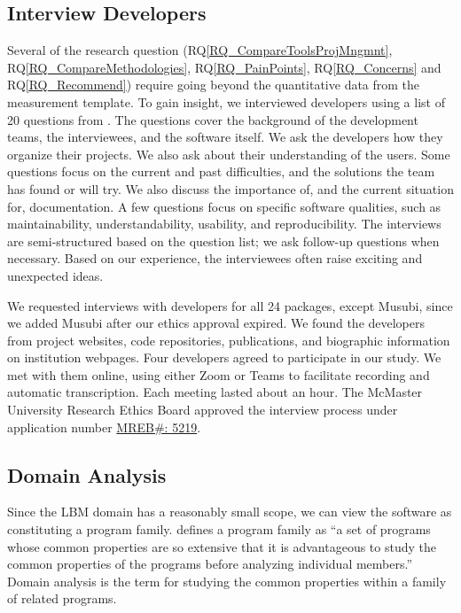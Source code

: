 \documentclass[final, 3p, times, authoryear]{elsarticle}
\newcommand{\rqref}[1]{RQ\ref{#1}}
\begin{document}
\subsection{Interview Developers} \label{SecSurvey}

Several of the research question (\rqref{RQ_CompareToolsProjMngmnt},
\rqref{RQ_CompareMethodologies}, \rqref{RQ_PainPoints}, \rqref{RQ_Concerns} and
\rqref{RQ_Recommend}) require going beyond the quantitative data from the
measurement template. To gain insight, we interviewed developers using a list of
20 questions from \citet{SmithEtAl2021}. The questions cover the background of
the development teams, the interviewees, and the software itself. We ask the
developers how they organize their projects. We also ask about their
understanding of the users. Some questions focus on the current and past
difficulties, and the solutions the team has found or will try. We also discuss
the importance of, and the current situation for, documentation. A few questions
focus on specific software qualities, such as maintainability,
understandability, usability, and reproducibility. The interviews are
semi-structured based on the question list; we ask follow-up questions when
necessary. Based on our experience, the interviewees often raise exciting and
unexpected ideas.

We requested interviews with developers for all 24 packages, except Musubi,
since we added Musubi after our ethics approval expired. We found the developers
from project websites, code repositories, publications, and biographic
information on institution webpages. Four developers agreed to participate in
our study. We met with them online, using either Zoom or Teams to facilitate
recording and automatic transcription. Each meeting lasted about an hour. The
McMaster University Research Ethics Board approved the interview process under
application number
\href{https://github.com/smiths/AIMSS/blob/master/StateOfPractice/MACREM/Application.pdf}
{MREB\#: 5219}.

\subsection{Domain Analysis} \label{SecDomainAnalysis}

Since the LBM domain has a reasonably small scope, we can view the software as
constituting a program family.  \citet{parnas1976design} defines a program
family as ``a set of programs whose common properties are so extensive that it
is advantageous to study the common properties of the programs before analyzing
individual members.'' Domain analysis is the term for studying the common
properties within a family of related programs.
\end{document}
